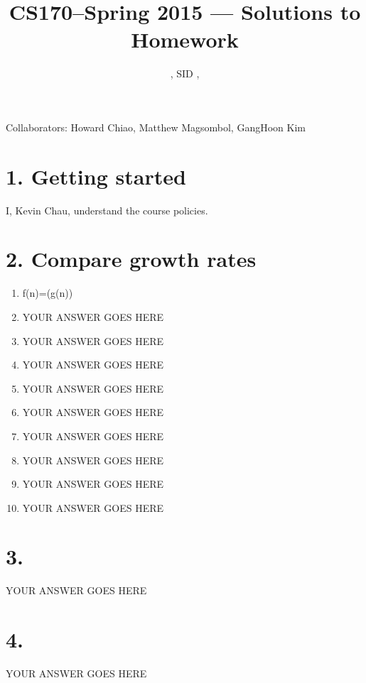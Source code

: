 \documentclass[11pt]{article}
\title{CS170--Spring 2015 --- Solutions to Homework \Homework}
\author{\Name, SID \SID, \texttt{\Login}}
\date{}
\newenvironment{qparts}{\begin{enumerate}[{(}a{)}]}{\end{enumerate}}
\begin{document}
\maketitle

Collaborators: Howard Chiao, Matthew Magsombol, GangHoon Kim

\section*{1. Getting started}
\item
I, Kevin Chau, understand the course policies.



\newpage
\section*{2. Compare growth rates}
\begin{qparts}
\item
f(n)=\omega(g(n))

\item
YOUR ANSWER GOES HERE

\item
YOUR ANSWER GOES HERE

\item
YOUR ANSWER GOES HERE

\item
YOUR ANSWER GOES HERE

\item
YOUR ANSWER GOES HERE

\item
YOUR ANSWER GOES HERE

\item
YOUR ANSWER GOES HERE

\item
YOUR ANSWER GOES HERE

\item
YOUR ANSWER GOES HERE
\end{qparts}


\newpage
\section*{3.}
YOUR ANSWER GOES HERE


\newpage
\section*{4.}
YOUR ANSWER GOES HERE


\newpage
\end{document}

